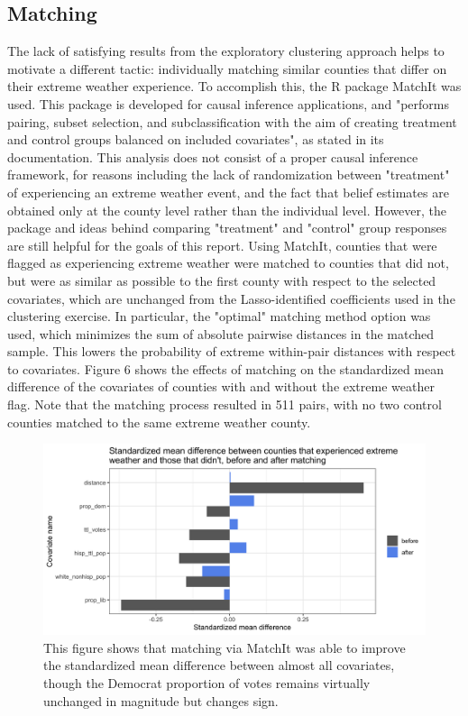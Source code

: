 \documentclass{article}
\begin{document}
\subsection{Matching}
The lack of satisfying results from the exploratory clustering approach helps to motivate a different tactic: individually matching similar counties that differ on their extreme weather experience. To accomplish this, the R package MatchIt was used. This package is developed for causal inference applications, and "performs pairing, subset selection, and subclassification with the aim of creating treatment and control groups balanced on included covariates", as stated in its documentation. This analysis does not consist of a proper causal inference framework, for reasons including the lack of randomization between "treatment" of experiencing an extreme weather event, and the fact that belief estimates are obtained only at the county level rather than the individual level. However, the package and ideas behind comparing "treatment" and "control" group responses are still helpful for the goals of this report. Using MatchIt, counties that were flagged as experiencing extreme weather were matched to counties that did not, but were as similar as possible to the first county with respect to the selected covariates, which are unchanged from the Lasso-identified coefficients used in the clustering exercise. In particular, the "optimal" matching method option was used, which minimizes the sum of absolute pairwise distances in the matched sample. This lowers the probability of extreme within-pair distances with respect to covariates. Figure 6 shows the effects of matching on the standardized mean difference of the covariates of counties with and without the extreme weather flag. Note that the matching process resulted in 511 pairs, with no two control counties matched to the same extreme weather county.

\begin{figure}[H]
\centering
\includegraphics[scale = 0.2]{images/matching_balance_plot.png}
\caption{This figure shows that matching via MatchIt was able to improve the standardized mean difference between almost all covariates, though the Democrat proportion of votes remains virtually unchanged in magnitude but changes sign.}
\end{figure}
\end{document}
